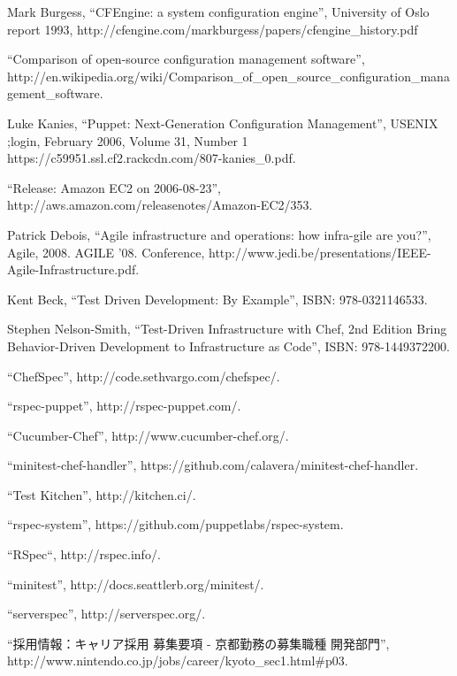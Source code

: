 \begin{thebibliography}{99}

Mark Burgess, ``CFEngine: a system configuration engine'',
University of Oslo report 1993,
http://cfengine.com/markburgess/papers/cfengine\_history.pdf

``Comparison of open-source configuration management software'',
http://en.wikipedia.org/wiki/Comparison\_of\_open\_source\_configuration\_management\_software.

Luke Kanies,
``Puppet: Next-Generation Configuration Management'',
USENIX ;login, February 2006, Volume 31, Number 1
https://c59951.ssl.cf2.rackcdn.com/807-kanies\_0.pdf.

``Release: Amazon EC2 on 2006-08-23'',
http://aws.amazon.com/releasenotes/Amazon-EC2/353.

Patrick Debois,
``Agile infrastructure and operations: how infra-gile are you?'',
Agile, 2008. AGILE '08. Conference,
http://www.jedi.be/presentations/IEEE-Agile-Infrastructure.pdf.

Kent Beck,
``Test Driven Development: By Example'',
ISBN: 978-0321146533.

Stephen Nelson-Smith,
``Test-Driven Infrastructure with Chef, 2nd Edition
Bring Behavior-Driven Development to Infrastructure as Code'',
ISBN: 978-1449372200.

``ChefSpec'', http://code.sethvargo.com/chefspec/.

``rspec-puppet'', http://rspec-puppet.com/.

``Cucumber-Chef'', http://www.cucumber-chef.org/.

``minitest-chef-handler'', https://github.com/calavera/minitest-chef-handler.

``Test Kitchen'', http://kitchen.ci/.

``rspec-system'', https://github.com/puppetlabs/rspec-system.

``RSpec``, http://rspec.info/.

``minitest'', http://docs.seattlerb.org/minitest/.

``serverspec'', http://serverspec.org/.

``採用情報：キャリア採用 募集要項 - 京都勤務の募集職種 開発部門'',
http://www.nintendo.co.jp/jobs/career/kyoto\_sec1.html\#p03.


\end{thebibliography}
